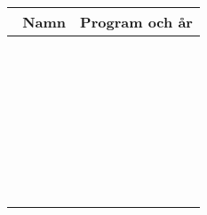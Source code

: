\documentclass[10pt]{article}
\begin{document}
\begin{multicols*}{2}
        \begin{table}[H]
        \begin{tabularx}{0.5\textwidth}{|X|p{1.5cm}|}
            \hline
            {\ \newline Namn} & {Program och år} \\ \hline
            &\\ \hline
            &\\ \hline
            &\\ \hline
            &\\ \hline
            &\\ \hline
            &\\ \hline
            &\\ \hline
            &\\ \hline
            &\\ \hline
            &\\ \hline
            &\\ \hline
            &\\ \hline
            &\\ \hline
            &\\ \hline
            &\\ \hline
            &\\ \hline
            &\\ \hline
            &\\ \hline
            &\\ \hline
            &\\ \hline
            &\\ \hline
            &\\ \hline
            &\\ \hline
            &\\ \hline
            &\\ \hline
            &\\ \hline
            &\\ \hline
            &\\ \hline
            &\\ \hline
            &\\ \hline
            &\\ \hline
            &\\ \hline
        \end{tabularx}
        \end{table}
    \end{multicols*}
\end{document}
